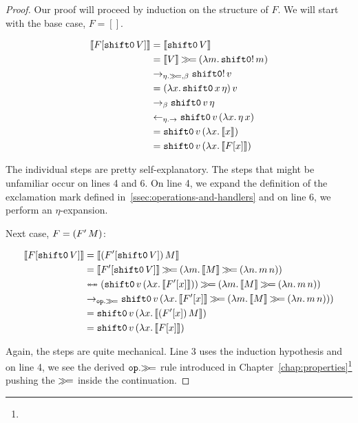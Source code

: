 \begin{proof}
Our proof will proceed by induction on the structure of $F$. We will start
with the base case, $F = []$.

\begin{align}
  \llbracket F[\mathtt{shift0}\,V] \rrbracket
  &= \llbracket \mathtt{shift0}\,V \rrbracket \\
  &= \llbracket V \rrbracket \mathbin{\gg\!=} (\lambda m.\, \mathtt{shift0}!\,m) \\
  &\to_{\eta.\mathbin{\gg\!=},\beta} \mathtt{shift0}!\,v \\
  &= (\lambda x.\, \mathtt{shift0}\,x\,\eta)\,v \\
  &\to_\beta \mathtt{shift0}\,v\,\eta \\
  &\leftarrow_{\eta.\to} \mathtt{shift0}\,v\,(\lambda x.\, \eta\,x) \\
  &= \mathtt{shift0}\,v\,(\lambda x.\, \llbracket x \rrbracket) \\
  &= \mathtt{shift0}\,v\,(\lambda x.\, \llbracket F[x] \rrbracket)
\end{align}
\setcounter{equation}{0}

The individual steps are pretty self-explanatory. The steps that might be
unfamiliar occur on lines 4 and 6. On line 4, we expand the definition of
the exclamation mark defined in~\ref{ssec:operations-and-handlers} and on
line 6, we perform an $\eta$-expansion.

Next case, $F = (F'\,M)$:

\begin{align}
  \sem{F[\ap{\shifto}{V}]}
  &= \sem{\ap{(F'[\ap{\shifto}{V}])}{M}} \\
  &= \sem{F'[\ap{\shifto}{V}]} \hsbind (\lam{m}{\sem{M} \hsbind (\lam{n}{\ap{m}{n}})}) \\
  &\ttoffrom (\app{\op{shift0}}{v}{(\lam{x}{\sem{F'[x]}})}) \hsbind (\lam{m}{\sem{M} \hsbind (\lam{n}{\ap{m}{n}})}) \\
  &\to_{\op{op}.\hsbind} \app{\op{shift0}}{v}{(\lam{x}{\sem{F'[x]} \hsbind (\lam{m}{\sem{M} \hsbind (\lam{n}{\ap{m}{n}})})})} \\
  &= \app{\op{shift0}}{v}{(\lam{x}{\sem{\ap{(F'[x])}{M}}})} \\
  &= \app{\op{shift0}}{v}{(\lam{x}{\sem{F[x]}})} \\
\end{align}
\setcounter{equation}{0}

Again, the steps are quite mechanical. Line 3 uses the induction hypothesis
and on line 4, we see the derived $\mathtt{op}.\mathbin{\gg\!=}$ rule introduced in
Chapter~\ref{chap:properties}\footnote{} pushing the
$\mathbin{\gg\!=}$ inside the continuation.


\end{proof}

